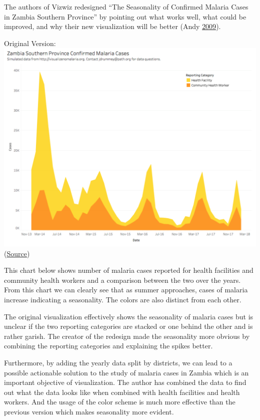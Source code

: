 \documentclass[]{book}
\begin{document}
The authors of Vizwiz redesigned ``The Seasonality of Confirmed Malaria Cases in Zambia Southern Province'' by pointing out what works well, what could be improved, and why their new visualization will be better (Andy \protect\hyperlink{ref-vizwiz}{2009}).

Original Version: \includegraphics{images/malaria_original.png}
(\href{https://www.path.org/visualize-no-malaria/}{Source})

This chart below shows number of malaria cases reported for health facilities and community health workers and a comparison between the two over the years. From this chart we can clearly see that as summer approaches, cases of malaria increase indicating a seasonality. The colors are also distinct from each other.

The original visualization effectively shows the seasonality of malaria cases but is unclear if the two reporting categories are stacked or one behind the other and is rather garish. The creator of the redesign made the seasonality more obvious by combining the reporting categories and explaining the spikes better.

Furthermore, by adding the yearly data split by districts, we can lead to a possible actionable solution to the study of malaria cases in Zambia which is an important objective of visualization. The author has combined the data to find out what the data looks like when combined with health facilities and health workers. And the usage of the color scheme is much more effective than the previous version which makes seasonality more evident.
\end{document}
